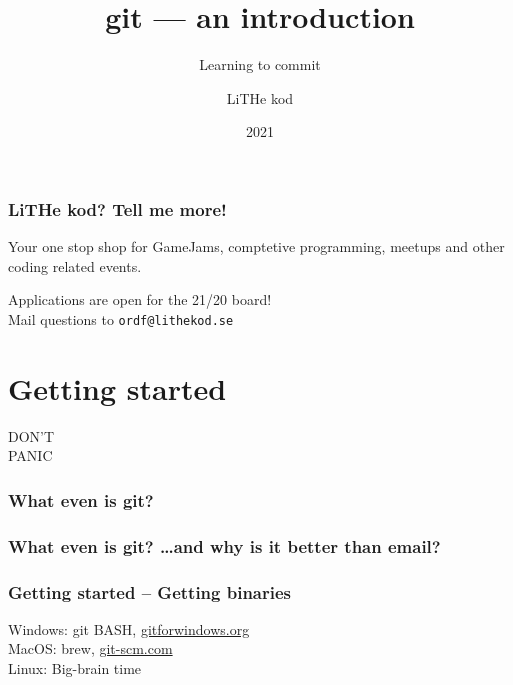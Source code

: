 \documentclass{beamer}
\title[git]{git --- an introduction}
\subtitle{Learning to commit}
\author{LiTHe kod}
\date{2021}
\begin{document}
\frame{\titlepage}
\frame{\tableofcontents}



\begin{frame}[fragile]
  \frametitle{LiTHe kod? Tell me more!}
  Your one stop shop for GameJams, comptetive programming, meetups and other coding related events.

  \vspace{2.0em}
  Applications are open for the 21/20 board! \\
  Mail questions to \texttt{ordf@lithekod.se} \\
\end{frame}

\section{Getting started}

\begin{frame}[fragile]
  \begin{center}
  \Huge \alert{DON'T\\PANIC}
  \end{center}
\end{frame}

\begin{frame}[fragile]
  \frametitle{What even is git?}
\end{frame}

\begin{frame}[fragile]
  \frametitle{What even is git? \dots and why is it better than email?}
\end{frame}

\begin{frame}[fragile]
  \frametitle{Getting started -- Getting binaries}
  
  Windows: git BASH, \url{gitforwindows.org}\\
  MacOS: brew, \url{git-scm.com}\\
  Linux: Big-brain time\\

\end{frame}
\end{document}
